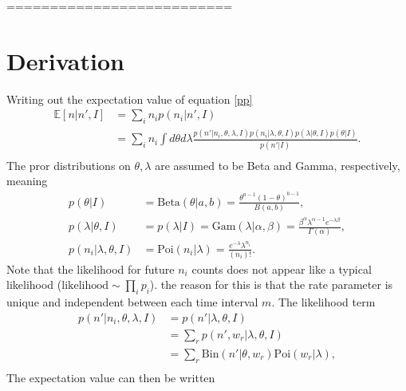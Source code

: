 ==========================


\chapter{Derivation}
\label{app:derivation}
Writing out the expectation value of equation \eqref{pp}
\begin{equation}
	\begin{split}
		\mathbb{E}[n|n',I] &= \sum_i n_ip(n_i|n',I)\\
		& = \sum_i n_i\int d\theta d\lambda  \frac{p(n'|n_i,\theta,\lambda,I)p(n_i|\lambda,\theta,I)p(\lambda|\theta,I)p(\theta|I)}{p(n'|I)}.\\
	\end{split}
\end{equation}
The pror distributions on $\theta,\lambda$ are assumed to be Beta and Gamma, respectively, meaning
\begin{equation}
	\begin{split}
		p(\theta|I)& = \text{Beta}(\theta|a,b)= \frac{\theta^{a-1}(1-\theta)^{b-1}}{B(a,b)},\\
		p(\lambda|\theta,I) & = p(\lambda|I) = \text{Gam}(\lambda|\alpha,\beta)=\frac{\beta^\alpha\lambda^{\alpha-1}e^{-\lambda \beta}}{\Gamma(\alpha)},\\
		p(n_i|\lambda,\theta,I) &= \text{Poi}(n_i|\lambda)= \frac{e^{-\lambda}\lambda^{n_i}}{(n_i)!}.
	\end{split}
\end{equation}
Note that the likelihood for future $n_i$ counts does not appear like a typical likelihood ($\text{likelihood}\sim \prod_ip_i$). the reason for this is that the rate parameter is unique and independent between each time interval $m$. The likelihood term
\begin{equation}
	\begin{split}
		p(n'|n_i,\theta,\lambda,I) & = p(n'|\lambda,\theta,I)\\
		& = \sum_r p(n',w_r|\lambda,\theta,I)\\
		& = \sum_r \text{Bin}(n'|\theta,w_r) \text{Poi}(w_r|\lambda),\\
	\end{split}
\end{equation}
The expectation value can then be written
